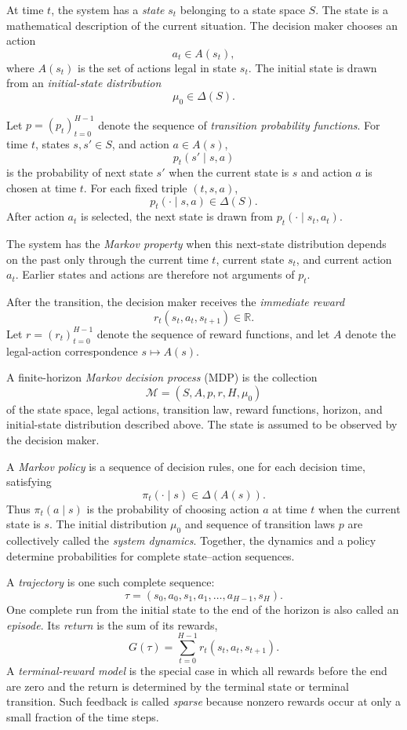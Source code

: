 At time $t$, the system has a \emph{state} $s_t$ belonging to a state space $S$. The state is a mathematical description of the current situation. The decision maker chooses an action
\[
    a_t\in A(s_t),
\]
where $A(s_t)$ is the set of actions legal in state $s_t$. The initial state is drawn from an \emph{initial-state distribution}
\[
    \mu_0\in\Delta(S).
\]

Let $p=(p_t)_{t=0}^{H-1}$ denote the sequence of \emph{transition probability functions}. For time $t$, states $s,s'\in S$, and action $a\in A(s)$,
\[
    p_t(s'\mid s,a)
\]
is the probability of next state $s'$ when the current state is $s$ and action $a$ is chosen at time $t$. For each fixed triple $(t,s,a)$,
\[
    p_t(\cdot\mid s,a)\in\Delta(S).
\]
After action $a_t$ is selected, the next state is drawn from $p_t(\cdot\mid s_t,a_t)$.

The system has the \emph{Markov property} when this next-state distribution depends on the past only through the current time $t$, current state $s_t$, and current action $a_t$. Earlier states and actions are therefore not arguments of $p_t$.

After the transition, the decision maker receives the \emph{immediate reward}
\[
    r_t(s_t,a_t,s_{t+1})\in\mathbb{R}.
\]
Let $r=(r_t)_{t=0}^{H-1}$ denote the sequence of reward functions, and let $A$ denote the legal-action correspondence $s\mapsto A(s)$.

A finite-horizon \emph{Markov decision process} (MDP) is the collection
\[
    \mathcal{M}=(S,A,p,r,H,\mu_0)
\]
of the state space, legal actions, transition law, reward functions, horizon, and initial-state distribution described above. The state is assumed to be observed by the decision maker.

A \emph{Markov policy} is a sequence of decision rules, one for each decision time, satisfying
\[
    \pi_t(\cdot\mid s)\in\Delta(A(s)).
\]
Thus $\pi_t(a\mid s)$ is the probability of choosing action $a$ at time $t$ when the current state is $s$. The initial distribution $\mu_0$ and sequence of transition laws $p$ are collectively called the \emph{system dynamics}. Together, the dynamics and a policy determine probabilities for complete state--action sequences.

A \emph{trajectory} is one such complete sequence:
\[
    \tau=(s_0,a_0,s_1,a_1,\ldots,a_{H-1},s_H).
\]
One complete run from the initial state to the end of the horizon is also called an \emph{episode}.
Its \emph{return} is the sum of its rewards,
\[
    G(\tau)
    =
    \sum_{t=0}^{H-1}
    r_t(s_t,a_t,s_{t+1}).
\]
A \emph{terminal-reward model} is the special case in which all rewards before the end are zero and the return is determined by the terminal state or terminal transition. Such feedback is called \emph{sparse} because nonzero rewards occur at only a small fraction of the time steps.


